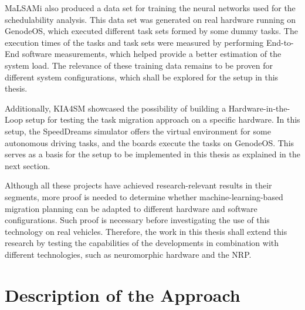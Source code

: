 MaLSAMi also produced a data set for training the neural networks used for the schedulability analysis. This data set was generated on real hardware running on GenodeOS, which executed different task sets formed by some dummy tasks. The execution times of the tasks and task sets were measured by performing End-to-End software measurements, which helped provide a better estimation of the system load. The relevance of these training data remains to be proven for different system configurations, which shall be explored for the setup in this thesis.

Additionally, KIA4SM showcased the possibility of building a Hardware-in-the-Loop setup for testing the task migration approach on a specific hardware. In this setup, the SpeedDreams simulator offers the virtual environment for some autonomous driving tasks, and the boards execute the tasks on GenodeOS. This serves as a basis for the setup to be implemented in this thesis as explained in the next section.

Although all these projects have achieved research-relevant results in their segments, more proof is needed to determine whether machine-learning-based migration planning can be adapted to different hardware and software configurations. Such proof is necessary before investigating the use of this technology on real vehicles. Therefore, the work in this thesis shall extend this research by testing the capabilities of the developments in combination with different technologies, such as neuromorphic hardware and the NRP.

\section*{Description of the Approach}\label{section:descriptionapproach}

